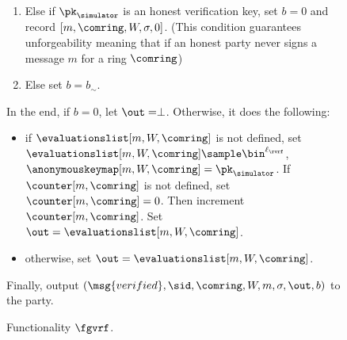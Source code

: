 \begin{figure}
\begin{tcolorbox}
{\begin{description}
\begin{enumerate}[label={{Cond.-} }{{\arabic*}}, start = 1]
					\item Else if $ \pk_\simulator $ is an honest verification key, set $ b = 0 $ and record $ [m, \comring,W,\sigma, 0] $. (This condition guarantees unforgeability meaning that if an honest party never signs a message $ m $ for a ring $ \comring $)\label{cond:forgery}
				\item Else set $ b = b_\sim$. \label{cond:simulatorbit}
				\end{enumerate}
				In the end, if $ b = 0 $, let $ \out = \perp $. Otherwise, it does the following:
				\begin{itemize}
					\item if $ \evaluationslist[m,W,\comring] $ is not defined, set $ \evaluationslist[m, W, \comring]\sample \bin^{\ell_\rvrf}$, $ \anonymouskeymap[m,W,\comring]  =  \pk_\simulator$. If $ \counter[m, \comring]  $ is not defined, set $ \counter[m, \comring]  = 0 $. Then increment $ \counter[m, \comring]  $. Set $ \out = \evaluationslist[m, W, \comring]$. 	
					\item otherwise, set $ \out = \evaluationslist[m, W, \comring]$. 	
				\end{itemize}
				Finally, output $(\msg{verified}, \sid, \comring,W, m, \sigma, \out, b)$ to the party.
				
			\end{description}
		
			
		}
	\end{tcolorbox}
	\caption{Functionality $\fgvrf$.\label{f:gvrf}}
\end{figure}
	


